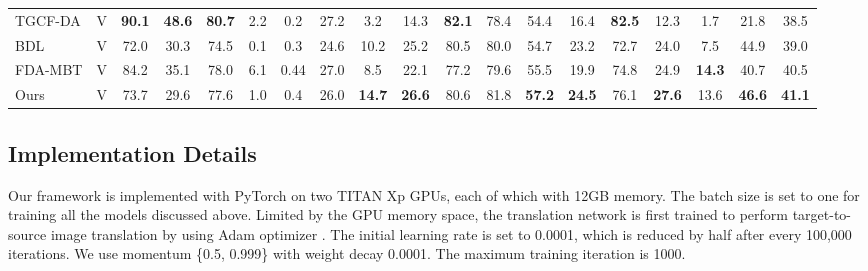 \documentclass[runningheads]{llncs}
\begin{document}
\begin{table*}[t]
\begin{center}
\begin{tabular}{ @{} l|c|*{16}{c}|*{1}{c} @{} }
				TGCF-DA \cite{Choi2019self} & V &
				\bf90.1 & \bf48.6 & \bf80.7 & 2.2 & 0.2 & 27.2 & 3.2 & 14.3 & \bf82.1 & 78.4 & 54.4 & 16.4 & \bf82.5 & 12.3 & 1.7 & 21.8 & 38.5 \\
				
				BDL \cite{li2019bidirectional} & V &
				72.0 & 30.3 & 74.5 & 0.1 & 0.3 & 24.6 & 10.2 & 25.2 & 80.5 & 80.0 &
				54.7 & 23.2 & 72.7 & 24.0 & 7.5 & 44.9 & 39.0 \\
				
				FDA-MBT \cite{yang2020fda} & V &
				84.2 & 35.1 & 78.0 & 6.1 & 0.44 & 27.0 & 8.5 & 
				22.1 & 77.2 & 79.6 & 55.5 & 19.9 & 74.8 & 24.9 & 
				\bf 14.3 & 40.7 & 40.5 \\
				
				\midrule
				Ours & V &
				73.7&29.6&77.6&1.0&0.4&26.0&\bf14.7&\bf26.6&80.6&81.8&\bf57.2&\bf24.5&76.1&\bf27.6&13.6&\bf46.6&
				\bf41.1 \\
				
				\bottomrule
			\end{tabular}
		\end{center}
\end{table*}
	
	\subsection{Implementation Details}
	Our framework is implemented with PyTorch \cite{paszke2017automatic} on two TITAN Xp GPUs, each of which with 12GB memory. The batch size is set to one for training all the models discussed above. Limited by the GPU memory space, the translation network is first trained to perform target-to-source image translation by using Adam optimizer \cite{kingma2014adam}. The initial learning rate is set to 0.0001, which is reduced by half after every 100,000 iterations. We use momentum \{0.5, 0.999\} with weight decay 0.0001. The maximum training iteration is 1000. 
	
\end{document}
